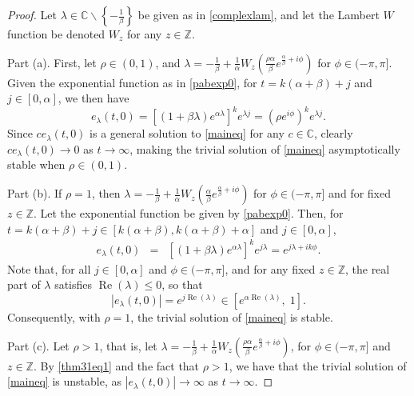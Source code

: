 \documentclass[12pt,reqno]{amsart}
\theoremstyle{plain}
\theoremstyle{definition}
\newcommand{\Z}{\ensuremath{\mathbb{Z}}}
\newcommand{\C}{\ensuremath{\mathbb{C}}}
\numberwithin{equation}{section}
\numberwithin{theorem}{section}
\begin{document}
\begin{proof}
Let $\lambda\in\C\backslash\left\{-\frac{1}{\beta}\right\}$ be given as in \eqref{complexlam}, and let the Lambert $W$ function be denoted $W_z$ for any $z\in\Z$. 

Part (a).
First, let $\rho\in(0,1)$, and $\lambda=-\frac{1}{\beta}+\frac{1}{\alpha}W_z\left(\frac{\rho \alpha}{\beta}e^{\frac{\alpha}{\beta}+i\phi}\right)$ for $\phi\in(-\pi,\pi]$. Given the exponential function as in \eqref{pabexp0}, for $t=k(\alpha+\beta)+j$ and $j\in[0,\alpha]$, we then have 
\begin{equation}\label{thm31eq1}
 e_{\lambda}(t,0)=\left[(1+\beta\lambda)e^{\alpha\lambda}\right]^{k}e^{\lambda j}=\left(\rho e^{i\phi}\right)^{k}e^{\lambda j}. 
\end{equation}
Since $c e_{\lambda}(t,0)$ is a general solution to \eqref{maineq} for any $c\in\C$, clearly $c e_{\lambda}(t,0)\rightarrow 0$ as $t\rightarrow\infty$, making the trivial solution of \eqref{maineq} asymptotically stable when $\rho\in(0,1)$.

Part (b). If $\rho=1$, then $\lambda=-\frac{1}{\beta}+\frac{1}{\alpha}W_z\left(\frac{\alpha}{\beta}e^{\frac{\alpha}{\beta}+i\phi}\right)$ for $\phi\in(-\pi,\pi]$ and for fixed $z\in\Z$. Let the exponential function be given by \eqref{pabexp0}. Then, for $t=k(\alpha+\beta)+j\in[k(\alpha+\beta),k(\alpha+\beta)+\alpha]$ and $j\in[0,\alpha]$, 
\begin{eqnarray*}
 e_{\lambda}(t,0) &=& \left[(1+\beta\lambda)e^{\alpha\lambda}\right]^ke^{j\lambda} = e^{j\lambda+ik\phi}.
\end{eqnarray*}
Note that, for all $j\in[0,\alpha]$ and $\phi\in(-\pi,\pi]$, and for any fixed $z\in\Z$, the real part of $\lambda$ satisfies $\operatorname{Re}(\lambda)\le 0$, so that
\[ |e_{\lambda}(t,0)| = e^{j\operatorname{Re}(\lambda)}\in\left[e^{\alpha\operatorname{Re}(\lambda)},\;1\right]. \]
Consequently, with $\rho=1$, the trivial solution of \eqref{maineq} is stable.

Part (c). Let $\rho>1$, that is, let $\lambda=-\frac{1}{\beta}+\frac{1}{\alpha}W_z\left(\frac{\rho \alpha}{\beta}e^{\frac{\alpha}{\beta}+i\phi}\right)$, for $\phi\in(-\pi,\pi]$ and $z\in\Z$. By \eqref{thm31eq1} and the fact that $\rho>1$, we have that the trivial solution of \eqref{maineq} is unstable, as $|e_{\lambda}(t,0)|\rightarrow\infty$ as $t\rightarrow\infty$.
\end{proof}

\end{document}
